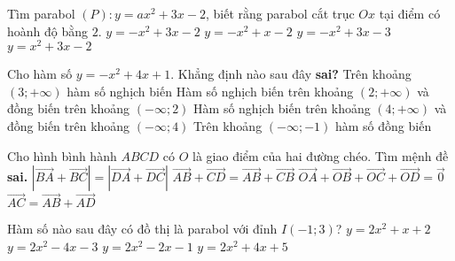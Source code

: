 \begin{ex}%
	Tìm parabol $(P)\colon y=ax^2+3x-2$, biết rằng parabol cắt trục $Ox$ tại điểm có hoành độ bằng $2$.
	\choice
	{\True $y=-x^2+3x-2$}
	{$y=-x^2+x-2$}
	{$y=-x^2+3x-3$}
	{$y=x^2+3x-2$}
\end{ex}
\begin{ex}%
	Cho hàm số $y=-x^2+4x+1$. Khẳng định nào sau đây {\bf sai?} 
	\choice
	{Trên khoảng $(3;+\infty)$ hàm số nghịch biến}
	{Hàm số nghịch biến trên khoảng $(2;+\infty)$ và đồng biến trên khoảng $(-\infty;2)$}
	{\True Hàm số nghịch biến trên khoảng $(4;+\infty)$ và đồng biến trên khoảng $(-\infty;4)$}
	{Trên khoảng $(-\infty;-1)$ hàm số đồng biến}
\end{ex}
\begin{ex}%
	Cho hình bình hành $ABCD$ có $O$ là giao điểm của hai đường chéo. Tìm mệnh đề {\bf sai.}
	\choice
	{$|\overrightarrow{BA}+\overrightarrow{BC}|=|\overrightarrow{DA}+\overrightarrow{DC}|$}
	{\True $\overrightarrow{AB}+\overrightarrow{CD}=\overrightarrow{AB}+\overrightarrow{CB}$}
	{$\overrightarrow{OA}+\overrightarrow{OB}+\overrightarrow{OC}+\overrightarrow{OD}=\overrightarrow{0}$}
	{$\overrightarrow{AC}=\overrightarrow{AB}+\overrightarrow{AD}$}
\end{ex}
\begin{ex}%
	Hàm số nào sau đây có đồ thị là parabol với đỉnh $I(-1;3)$?
	\choice
	{$y=2x^2+x+2$}
	{$y=2x^2-4x-3$}
	{$y=2x^2-2x-1$}
	{\True $y=2x^2+4x+5$}
\end{ex}
